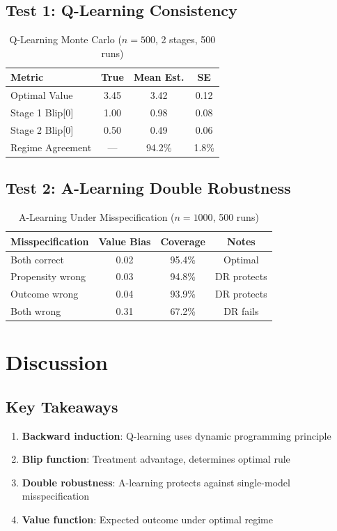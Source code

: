 \subsection{Test 1: Q-Learning Consistency}

\begin{table}[h]
\centering
\caption{Q-Learning Monte Carlo ($n=500$, 2 stages, 500 runs)}
\begin{tabular}{lccc}
\toprule
Metric & True & Mean Est. & SE \\
\midrule
Optimal Value & 3.45 & 3.42 & 0.12 \\
Stage 1 Blip[0] & 1.00 & 0.98 & 0.08 \\
Stage 2 Blip[0] & 0.50 & 0.49 & 0.06 \\
Regime Agreement & --- & 94.2\% & 1.8\% \\
\bottomrule
\end{tabular}
\end{table}

\subsection{Test 2: A-Learning Double Robustness}

\begin{table}[h]
\centering
\caption{A-Learning Under Misspecification ($n=1000$, 500 runs)}
\begin{tabular}{lccc}
\toprule
Misspecification & Value Bias & Coverage & Notes \\
\midrule
Both correct & 0.02 & 95.4\% & Optimal \\
Propensity wrong & 0.03 & 94.8\% & DR protects \\
Outcome wrong & 0.04 & 93.9\% & DR protects \\
Both wrong & 0.31 & 67.2\% & DR fails \\
\bottomrule
\end{tabular}
\end{table}


\section{Discussion}

\subsection{Key Takeaways}

\begin{enumerate}
\item \textbf{Backward induction}: Q-learning uses dynamic programming principle
\item \textbf{Blip function}: Treatment advantage, determines optimal rule
\item \textbf{Double robustness}: A-learning protects against single-model misspecification
\item \textbf{Value function}: Expected outcome under optimal regime
\end{enumerate}

